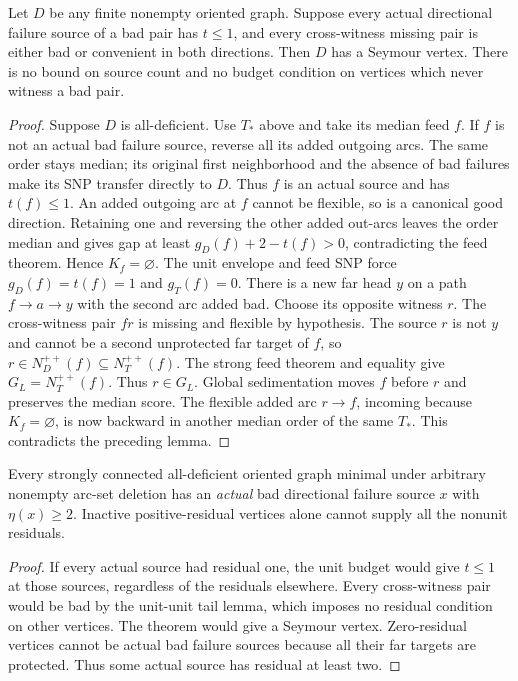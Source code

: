 \begin{theorem}
\label{thm:global-unit-flexible-witness-closure}
Let $D$ be any finite nonempty oriented graph. Suppose every actual
directional failure source of a bad pair has $t\le1$, and every
cross-witness missing pair is either bad or convenient in both directions.
Then $D$ has a Seymour vertex. There is no bound on source count and
no budget condition on vertices which never witness a bad pair.
\end{theorem}
\begin{proof}
Suppose $D$ is all-deficient. Use $T_*$ above and take its median feed $f$.
If $f$ is not an actual bad failure source, reverse all its added outgoing
arcs. The same order stays median; its original first neighborhood and
the absence of bad failures make its SNP transfer directly to $D$.
Thus $f$ is an actual source and has $t(f)\le1$.
An added outgoing arc at $f$ cannot be flexible, so is a canonical good
direction. Retaining one and reversing the other added out-arcs leaves
the order median and gives gap at least $g_D(f)+2-t(f)>0$, contradicting
the feed theorem. Hence $K_f=\varnothing$.
The unit envelope and feed SNP force $g_D(f)=t(f)=1$ and $g_T(f)=0$.
There is a new far head $y$ on a path $f\to a\to y$ with the second
arc added bad. Choose its opposite witness $r$. The cross-witness pair
$fr$ is missing and flexible by hypothesis. The source $r$ is not $y$
and cannot be a second unprotected
far target of $f$, so $r\in N_D^{++}(f)\subseteq N_T^{++}(f)$.
The strong feed theorem and equality give $G_L=N_T^{++}(f)$.
Thus $r\in G_L$. Global sedimentation moves $f$ before $r$ and preserves
the median score. The flexible added arc $r\to f$, incoming because
$K_f=\varnothing$, is now backward in another median order of the same
$T_*$. This contradicts the preceding lemma.
\end{proof}

\begin{corollary}
\label{cor:global-nonunit-actual-source}
Every strongly connected all-deficient oriented graph minimal under
arbitrary nonempty arc-set deletion has an \emph{actual} bad directional
failure source $x$ with $\eta(x)\ge2$. Inactive positive-residual vertices
alone cannot supply all the nonunit residuals.
\end{corollary}
\begin{proof}
If every actual source had residual one, the unit budget would give
$t\le1$ at those sources, regardless of the residuals elsewhere.
Every cross-witness pair would be bad by the unit-unit tail
lemma, which imposes no residual condition on other vertices.
The theorem would give a Seymour vertex. Zero-residual vertices cannot
be actual bad failure sources because all their far targets are protected.
Thus some actual source has residual at least two.
\end{proof}

